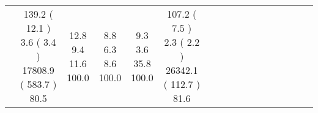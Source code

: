 \documentclass[9pt]{article}
\begin{document}
\begin{landscape}
\begin{longtable}{ l | c c c c | c c c c | c c c c | c c c c |}
 &
                    
                            \makecell{              139.2
     (             12.1
    ) \\
            {\footnotesize             3.6
     (              3.4
     )} \\
            {\footnotesize             17808.9
     (            583.7
    ) } \\
            {\small  \textcolor[rgb]{ 0.59 , 0.309 , 0.1} {80.5  }
} }


             &
                            \makecell{              12.8
     \\
            {\footnotesize             9.4
    } \\  {\footnotesize             11.6
     } \\
            {\small \textcolor[rgb]{ 0.2 , 0.7 , 0.1} {100.0  }
} }
             &                         \makecell{              8.8
     \\
            {\footnotesize             6.3
    } \\  {\footnotesize             8.6
     } \\
            {\small \textcolor[rgb]{ 0.2 , 0.7 , 0.1} {100.0  }
} }
             &
                            \makecell{              9.3
     \\
            {\footnotesize             3.6
    } \\  {\footnotesize             35.8
     } \\
            {\small \textcolor[rgb]{ 0.2 , 0.7 , 0.1} {100.0  }
} }
            

 & 
                            \makecell{              107.2
     (             7.5
    ) \\
            {\footnotesize             2.3
     (              2.2
     )} \\
            {\footnotesize             26342.1
     (            112.7
    ) } \\
            {\small  \textcolor[rgb]{ 0.568 , 0.332 , 0.1} {81.6  }
} }



\end{longtable}
\end{landscape}
\end{document}
